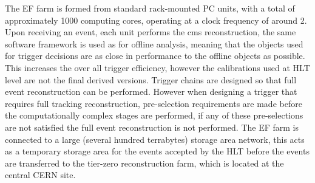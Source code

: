 The EF farm is formed from standard rack-mounted PC units, with a total of
approximately 1000 computing cores, operating at a clock frequency of around
\unit{2}{\giga\hertz}. Upon receiving an event, each unit performs the \ac{cms}
reconstruction, the same software framework is used as for offline analysis,
meaning that the objects used for trigger decisions are as close in performance
to the offline objects as possible. This increases the over all trigger
efficiency, however the calibrations used at HLT level are not the final
derived versions.
Trigger chains are designed so that full event reconstruction can be performed.
However when designing a trigger that requires full tracking reconstruction, 
pre-selection requirements are made before the computationally complex stages 
are performed, if any of these pre-selections are not satisfied the full event 
reconstruction is not performed. The EF farm is connected to a large (several 
hundred terrabytes) storage area network, this acts as a temporary storage area 
for the events accepted by the HLT before the events are transferred to the 
tier-zero reconstruction farm, which is located at the central CERN site.



